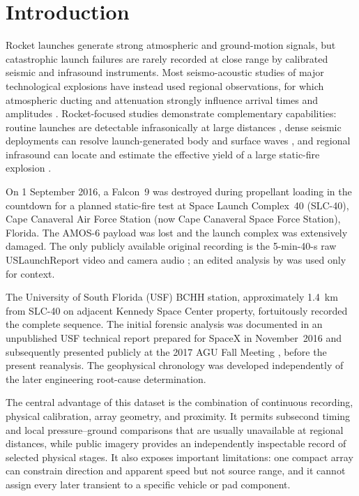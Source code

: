 \documentclass[]{seismica}
\begin{document}
\section{Introduction}
\label{sec:introduction}

Rocket launches generate strong atmospheric and ground-motion signals, but
catastrophic launch failures are rarely recorded at close range by calibrated
seismic and infrasound instruments. Most seismo-acoustic studies of major
technological explosions have instead used regional observations, for which
atmospheric ducting and attenuation strongly influence arrival times and
amplitudes \citep{ottemoller_2008,green_2008,ceranna_2009,smink_2019,
pilger_beirut_2021,kim_pasyanos_2022}. Rocket-focused studies demonstrate
complementary capabilities: routine launches are detectable infrasonically at
large distances \citep{pilger_rocket_2021}, dense seismic deployments can
resolve launch-generated body and surface waves
\citep{schuster_rocketquake_2025}, and regional infrasound can locate and
estimate the effective yield of a large static-fire explosion
\citep{silber_scamfer_newglenn_2026}.

On 1 September 2016, a Falcon~9 was destroyed during propellant loading in the
countdown for a planned static-fire test at Space Launch Complex~40 (SLC-40),
Cape Canaveral Air Force Station (now Cape Canaveral Space Force Station),
Florida. The AMOS-6 payload was lost and the launch complex was extensively
damaged. The only publicly available original recording is the 5-min-40-s raw
USLaunchReport video and camera audio \citep{uslaunchreport_amos6_video_2016};
an edited analysis by \citet{manley_spacex_explosion_2016} was used only for
context.

The University of South Florida (USF) BCHH station, approximately 1.4~km from
SLC-40 on adjacent Kennedy Space Center property, fortuitously recorded the
complete sequence. The initial forensic analysis was documented in an
unpublished USF technical report prepared for SpaceX in November~2016
\citep{thompson_mcnutt_fireball_2016} and subsequently presented publicly at
the 2017 AGU Fall Meeting \citep{thompson_agu_falcon9_2017}, before the
present reanalysis. The geophysical chronology was developed independently of
the later engineering root-cause determination.

The central advantage of this dataset is the combination of continuous
recording, physical calibration, array geometry, and proximity. It permits
subsecond timing and local pressure--ground comparisons that are usually
unavailable at regional distances, while public imagery provides an
independently inspectable record of selected physical stages. It also exposes
important limitations: one compact array can constrain direction and apparent
speed but not source range, and it cannot assign every later transient to a
specific vehicle or pad component.
\end{document}
